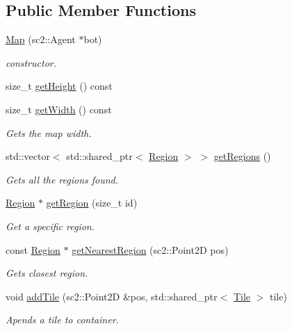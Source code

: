 \subsection*{Public Member Functions}
\begin{DoxyCompactItemize}
\item 
\hyperlink{classOverseer_1_1Map_a4f7eabe216b39eb4a63a8d0b4f8abf60}{Map} (sc2\+::\+Agent $\ast$bot)
\begin{DoxyCompactList}\small\item\em constructor. \end{DoxyCompactList}\item 
size\+\_\+t \hyperlink{classOverseer_1_1Map_a9993be7938014be6b9d66ffb0475a311}{get\+Height} () const 
\item 
size\+\_\+t \hyperlink{classOverseer_1_1Map_a803fae03c7ba59500f55c05dbc269c34}{get\+Width} () const 
\begin{DoxyCompactList}\small\item\em Gets the map width. \end{DoxyCompactList}\item 
std\+::vector$<$ std\+::shared\+\_\+ptr$<$ \hyperlink{classOverseer_1_1Region}{Region} $>$ $>$ \hyperlink{classOverseer_1_1Map_a90e9f9fd99091c142c4f07c5dc2ae7a3}{get\+Regions} ()
\begin{DoxyCompactList}\small\item\em Gets all the regions found. \end{DoxyCompactList}\item 
\hyperlink{classOverseer_1_1Region}{Region} $\ast$ \hyperlink{classOverseer_1_1Map_a419096dd4589e51c22b12018b8d9cbc1}{get\+Region} (size\+\_\+t id)
\begin{DoxyCompactList}\small\item\em Get a specific region. \end{DoxyCompactList}\item 
const \hyperlink{classOverseer_1_1Region}{Region} $\ast$ \hyperlink{classOverseer_1_1Map_ad49a674353cdf1fdda3aadc929fdbce0}{get\+Nearest\+Region} (sc2\+::\+Point2D pos)
\begin{DoxyCompactList}\small\item\em Gets closest region. \end{DoxyCompactList}\item 
void \hyperlink{classOverseer_1_1Map_afb26aba6abeaa039ae83b40c8235dee9}{add\+Tile} (sc2\+::\+Point2D \&pos, std\+::shared\+\_\+ptr$<$ \hyperlink{classOverseer_1_1Tile}{Tile} $>$ tile)
\begin{DoxyCompactList}\small\item\em Apends a tile to container. \end{DoxyCompactList}\item 

\end{DoxyCompactItemize}
